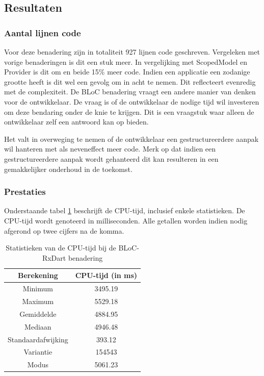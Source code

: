 \subsection{Resultaten}
\subsubsection{Aantal lijnen code}
Voor deze benadering zijn in totaliteit 927 lijnen code geschreven. Vergeleken met vorige benaderingen is dit een stuk meer. In vergelijking met ScopedModel en Provider is dit om en beide 15\% meer code. Indien een applicatie een zodanige grootte heeft is dit wel een gevolg om in acht te nemen. Dit reflecteert evenredig met de complexiteit. De BLoC benadering vraagt een andere manier van denken voor de ontwikkelaar. De vraag is of de ontwikkelaar de nodige tijd wil investeren om deze bendaring onder de knie te krijgen. Dit is een vraagstuk waar alleen de ontwikkelaar zelf een antwoord kan op bieden.

Het valt in overweging te nemen of de ontwikkelaar een gestructureerdere aanpak wil hanteren met als neveneffect meer code. Merk op dat indien een gestructureerdere aanpak wordt gehanteerd dit kan resulteren in een gemakkelijker onderhoud in de toekomst. 
\subsubsection{Prestaties}
Onderstaande tabel \ref{table:experiment-bloc-rxdart-statistics} beschrijft de CPU-tijd, inclusief enkele statistieken. De CPU-tijd wordt genoteerd in milliseconden. Alle getallen worden indien nodig afgerond op twee cijfers na de komma.
\begin{table}[H]
    \centering
    \begin{tabular}{c|c}
        \textbf{Berekening} & \textbf{CPU-tijd (in ms)}  \\ \hline
        Minimum             & 3495.19                    \\ \hline
        Maximum             & 5529.18                    \\ \hline
        Gemiddelde          & 4884.95                    \\ \hline
        Mediaan             & 4946.48                    \\ \hline
        Standaardafwijking  & 393.12                     \\ \hline
        Variantie           & 154543                     \\ \hline
        Modus               & 5061.23                      \\                
    \end{tabular}
    \caption{Statistieken van de CPU-tijd bij de BLoC-RxDart benadering}
    \label{table:experiment-bloc-rxdart-statistics}
\end{table}

